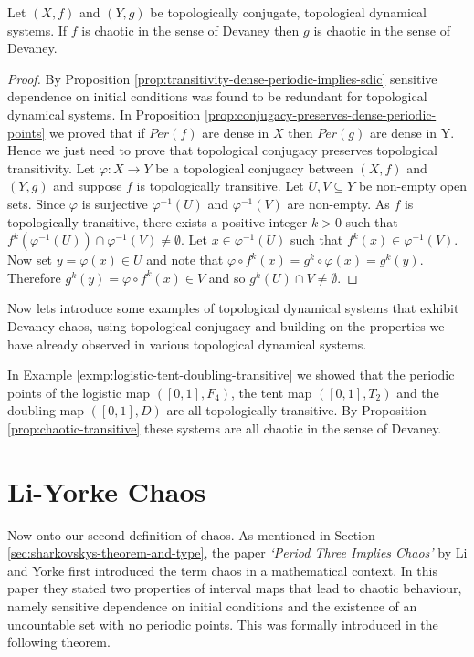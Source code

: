 \begin{prop}
    Let $(X, f)$ and $(Y, g)$ be topologically conjugate, topological dynamical systems. If $f$ is chaotic in the sense of Devaney then $g$ is chaotic in the sense of Devaney.
    \begin{proof}
        By Proposition \ref{prop:transitivity-dense-periodic-implies-sdic} sensitive dependence on initial conditions was found to be redundant for topological dynamical systems. In Proposition \ref{prop:conjugacy-preserves-dense-periodic-points} we proved that if $Per(f)$ are dense in $X$ then $Per(g)$ are dense in Y. Hence we just need to prove that topological conjugacy preserves topological transitivity. Let $\varphi: X \to Y$ be a topological conjugacy between $(X, f)$ and $(Y, g)$ and suppose $f$ is topologically transitive. Let $U, V \subseteq Y$ be non-empty open sets. Since $\varphi$ is surjective $\varphi^{-1}(U)$ and $\varphi^{-1}(V)$ are non-empty. As $f$ is topologically transitive, there exists a positive integer $k > 0$ such that $f^k(\varphi^{-1}(U)) \cap \varphi^{-1}(V) \neq \emptyset$. Let $x \in \varphi^{-1}(U)$ such that $f^k(x) \in \varphi^{-1}(V)$. Now set $y = \varphi(x) \in U$ and note that $\varphi \circ f^k(x) = g^k \circ \varphi(x) = g^k(y)$. Therefore $g^k(y) = \varphi \circ f^k(x) \in V$ and so $g^k(U) \cap V \neq \emptyset$.
    \end{proof}
\end{prop}

Now lets introduce some examples of topological dynamical systems that exhibit Devaney chaos, using topological conjugacy and building on the properties we have already observed in various topological dynamical systems.

\begin{exmp}
    In Example \ref{exmp:logistic-tent-doubling-transitive} we showed that the periodic points of the logistic map $([0, 1], F_4)$, the tent map $([0, 1], T_2)$ and the doubling map $([0, 1], D)$ are all topologically transitive. By Proposition \ref{prop:chaotic-transitive} these systems are all chaotic in the sense of Devaney.
\end{exmp}

\section{Li-Yorke Chaos} \label{sec:li-yorke-chaos}

Now onto our second definition of chaos. As mentioned in Section \ref{sec:sharkovskys-theorem-and-type}, the paper \emph{`Period Three Implies Chaos'} by Li and Yorke \cite{li-yorke} first introduced the term chaos in a mathematical context. In this paper they stated two properties of interval maps that lead to chaotic behaviour, namely sensitive dependence on initial conditions and the existence of an uncountable set with no periodic points. This was formally introduced in the following theorem.

